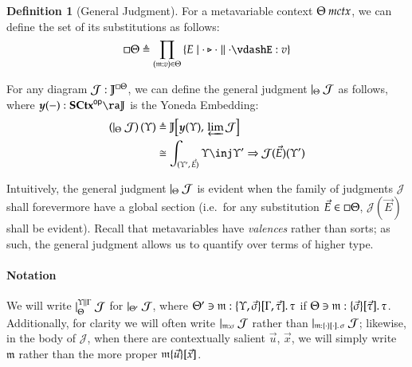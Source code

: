 \documentclass[11pt]{article}
\theoremstyle{definition}
\newtheorem{definition}[thm]{Definition}
\theoremstyle{remark}
\numberwithin{equation}{section}
\def\IModeColorName{MidnightBlue}
\def\OModeColorName{Maroon}
\def\IModeColorName{Black}
\def\OModeColorName{Black}
\newcommand\IMode[1]{{\color{\IModeColorName}{#1}}}
\newcommand\OMode[1]{{\color{\OModeColorName}{#1}}}
\newcommand\GenJ[2]{\vert_{\IMode{#1}}\; #2}
\newcommand\HPGenJ[4]{\vert^{\IMode{#1}\parallel\IMode{#2}}_{\IMode{#3}}\; #4}
\newcommand\MkSet[1]{\left\{#1\right\}}
\newcommand\Member[2]{\IMode{#1}\in\IMode{#2}}
\newcommand\Of[2]{\IMode{#1}: \IMode{#2}}
\newcommand\MkValence[3]{%
  \ifthenelse{\equal{#1}{}}{}{%
    \{#1\}%
  }%
  \ifthenelse{\equal{#2}{}}{}{%
    [#2]%
  }.\, #3%
}
\newcommand\SCtx{\mathbf{SCtx}}
\newcommand\OpCat[1]{#1^{\mathsf{op}}}
\newcommand\IsMetaCtx[1]{\IMode{#1}\ \textit{mctx}}
\newcommand\Lookup[3]{\IMode{#1}\ni\IMode{#2}:\OMode{#3}}
\newcommand\IsAbtUnmoded[5]{
  #1\triangleright%
  #2\parallel%
  #3\vdash%
  #4:\OMode{#5}%
}
\newcommand\MV[1]{\mathfrak{#1}}
\newcommand\MApp[3]{%
  #1
  \ifthenelse{\equal{#2}{}}{}{%
    \{#2\}%
  }%
  \ifthenelse{\equal{#3}{}}{}{%
    [#3]%
  }
}
\newcommand\Hom[3]{#1\!\left[#2,\,#3\right]}
\newcommand\Define[2]{\IMode{#1}\triangleq\OMode{#2}}
\newcommand\ADefine[2]{\IMode{#1}&\triangleq\OMode{#2}}
\newcommand\Yoneda[1]{\boldsymbol{y} (#1)}
\begin{document}
\begin{definition}[General Judgment]
  For a metavariable context $\IsMetaCtx{\Theta}$, we can define the set
  of its substitutions as follows:
  \[
    \Define{{\square\Theta}}{
      \prod_{(\MV{m}:v)\in\Theta}
        \MkSet{E\mid\IsAbtUnmoded{\cdot}{\cdot}{\cdot}{E}{v}}
    }
  \]

  For any diagram $\Of{\mathcal{J}}{\mathbb{J}^{\square\Theta}}$, we can define
  the general judgment $\GenJ{\Theta}{\mathcal{J}}$ as follows, where
  $\Of{\Yoneda{-}}{\OpCat{\SCtx}\ra\mathbb{J}}$ is the Yoneda Embedding:
  \begin{align*}
    \ADefine{
      \left(\GenJ{\Theta}{\mathcal{J}}\right)(\Upsilon)
    }{
      \Hom{\mathbb{J}}{
        \Yoneda{\Upsilon}
      }{
        \varprojlim\mathcal{J}
      }
    }\\
    &\cong
    \OMode{
      \int_{(\Upsilon',\,\vec{E})}{\Upsilon\inj\Upsilon'\Rightarrow{\mathcal{J}(\vec{E})(\Upsilon')}}
    }
  \end{align*}

   Intuitively, the general judgment $\GenJ{\Theta}{\mathcal{J}}$ is evident
   when the family of judgments $\mathcal{J}$ shall forevermore have a global
   section (i.e.\ for any substitution $\Member{\vec{E}}{\square\Theta}$,
   $\mathcal{J}(\vec{E})$ shall be evident). Recall that metavariables have
   \emph{valences} rather than sorts; as such, the general judgment allows us
   to quantify over terms of higher type.

   \paragraph{Notation}

   We will write $\HPGenJ{\Upsilon}{\Gamma}{\Theta}{\mathcal{J}}$ for
   $\GenJ{\Theta'}{\mathcal{J}}$, where
   $\Lookup{\Theta'}{\MV{m}}{\MkValence{\Upsilon,\vec{\sigma}}{\Gamma,\vec{\tau}}{\tau}}$
   if $\Lookup{\Theta}{\MV{m}}{\MkValence{\vec{\sigma}}{\vec{\tau}}{\tau}}$.
   Additionally, for clarity we will often write
   $\GenJ{\MV{m}:\sigma}{\mathcal{J}}$ rather than
   $\GenJ{\MV{m}:\MkValence{\cdot}{\cdot}{\sigma}}{\mathcal{J}}$; likewise, in
   the body of $\mathcal{J}$, when there are contextually salient
   $\vec{u}$, $\vec{x}$, we will simply write $\MV{m}$ rather than the more proper
   $\MApp{\MV{m}}{\vec{u}}{\vec{x}}$.

\end{definition}
\end{document}
